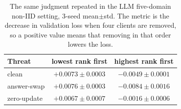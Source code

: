 \documentclass[letterpaper]{article} %
\theoremstyle{plain}
\begin{document}
\begin{table}[t]
\centering
\small
\caption{The same judgment repeated in the LLM five-domain non-IID setting,
3-seed mean$\pm$std. The metric is the decrease in validation loss when four
clients are removed, so a positive value means that removing in that order
lowers the loss.}
\label{tab:removal-llm}
\begin{tabular}{lcc}
\hline
Threat & lowest rank first & highest rank first \\
\hline
clean & $+0.0073\pm0.0003$ & $-0.0049\pm0.0001$ \\
answer-swap & $+0.0076\pm0.0003$ & $-0.0084\pm0.0016$ \\
zero-update & $+0.0067\pm0.0007$ & $-0.0016\pm0.0006$ \\
\hline
\end{tabular}
\end{table}


\end{document}
